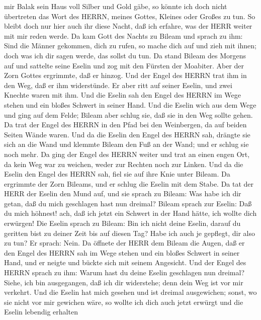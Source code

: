 mir Balak sein Haus voll Silber und Gold gäbe, so könnte ich doch nicht
übertreten das Wort des HERRN, meines Gottes, Kleines oder Großes zu
tun.  So bleibt doch nur hier auch ihr diese Nacht, daß ich
erfahre, was der HERR weiter mit mir reden werde.  Da kam
Gott des Nachts zu Bileam und sprach zu ihm: Sind die Männer gekommen,
dich zu rufen, so mache dich auf und zieh mit ihnen; doch was ich dir
sagen werde, das sollst du tun.  Da stand Bileam des
Morgens auf und sattelte seine Eselin und zog mit den Fürsten der
Moabiter.  Aber der Zorn Gottes ergrimmte, daß er hinzog.
Und der Engel des HERRN trat ihm in den Weg, daß er ihm widerstünde. Er
aber ritt auf seiner Eselin, und zwei Knechte waren mit ihm.
 Und die Eselin sah den Engel des HERRN im Wege stehen und
ein bloßes Schwert in seiner Hand. Und die Eselin wich aus dem Wege und
ging auf dem Felde; Bileam aber schlug sie, daß sie in den Weg sollte
gehen.  Da trat der Engel des HERRN in den Pfad bei den
Weinbergen, da auf beiden Seiten Wände waren.  Und da die
Eselin den Engel des HERRN sah, drängte sie sich an die Wand und klemmte
Bileam den Fuß an der Wand; und er schlug sie noch mehr. 
Da ging der Engel des HERRN weiter und trat an einen engen Ort, da kein
Weg war zu weichen, weder zur Rechten noch zur Linken.  Und
da die Eselin den Engel des HERRN sah, fiel sie auf ihre Knie unter
Bileam. Da ergrimmte der Zorn Bileams, und er schlug die Eselin mit dem
Stabe.  Da tat der HERR der Eselin den Mund auf, und sie
sprach zu Bileam: Was habe ich dir getan, daß du mich geschlagen hast
nun dreimal?  Bileam sprach zur Eselin: Daß du mich
höhnest! ach, daß ich jetzt ein Schwert in der Hand hätte, ich wollte
dich erwürgen!  Die Eselin sprach zu Bileam: Bin ich nicht
deine Eselin, darauf du geritten bist zu deiner Zeit bis auf diesen Tag?
Habe ich auch je gepflegt, dir also zu tun? Er sprach: Nein.
 Da öffnete der HERR dem Bileam die Augen, daß er den Engel
des HERRN sah im Wege stehen und ein bloßes Schwert in seiner Hand, und
er neigte und bückte sich mit seinem Angesicht.  Und der
Engel des HERRN sprach zu ihm: Warum hast du deine Eselin geschlagen nun
dreimal? Siehe, ich bin ausgegangen, daß ich dir widerstehe; denn dein
Weg ist vor mir verkehrt.  Und die Eselin hat mich gesehen
und ist dreimal ausgewichen; sonst, wo sie nicht vor mir gewichen wäre,
so wollte ich dich auch jetzt erwürgt und die Eselin lebendig erhalten
